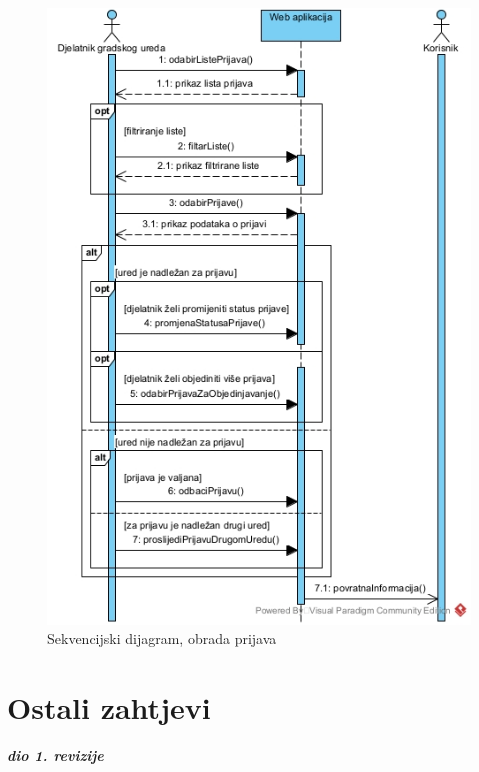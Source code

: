 				\begin{figure}[H]
					\includegraphics[width=\textwidth]{slike/Obrada_prijavaSD.jpg} %
					\caption{Sekvencijski dijagram, obrada prijava}
					\label{fig:sekvencijskiDijagram3} %
				\end{figure}
				\eject


	
		\section{Ostali zahtjevi}
		
			\textbf{\textit{dio 1. revizije}}\\
			
